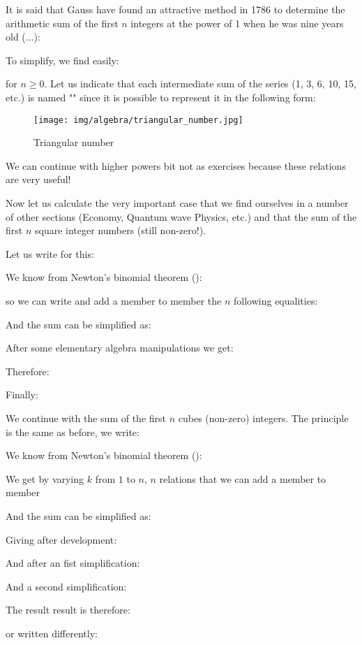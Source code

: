 	It is said that Gauss have found an attractive method in 1786 to determine the arithmetic sum of the first $n$ integers at the power of 1 when he was nine years old (...):
	
	To simplify, we find easily:
	
	for $n \geq 0$. Let us indicate that each intermediate sum of the series (1, 3, 6, 10, 15, etc.) is named "" since it is possible to represent it in the following form:

	\begin{figure}[H]
		\centering
		\texttt{[image: img/algebra/triangular\_number.jpg]}
		\caption{Triangular number}
	\end{figure}

	We can continue with higher powers bit not as exercises because these relations are very useful!

	Now let us calculate the very important case that we find ourselves in a number of other sections (Economy, Quantum wave Physics, etc.) and that  the sum of the first $n$ square integer numbers (still non-zero!).

	Let us write for this:
	
	We know from Newton's binomial theorem ():
	
	so we can write and add a member to member the $n$ following equalities:
	
	And the sum can be simplified as:
	
	After some elementary algebra manipulations we get:
	
	Therefore:
	
	Finally:
	
	We continue with the sum of the first $n$ cubes (non-zero) integers. The principle is the same as before, we write:
	
	We know from Newton's binomial theorem ():
	
	We get by varying $k$ from $1$ to $n$, $n$ relations that we can add a member to member
	
	And the sum can be simplified as:
	
	Giving after development:
	
	And after an fist simplification:
	
	And a second simplification:
	
	The result result is therefore:
	
	or written differently:
	
